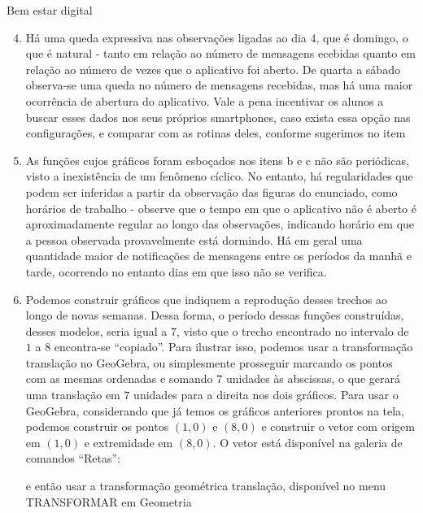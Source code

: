\clearmargin
\marginpar{\vspace{.5em}}
\begin{answer}{Bem estar digital}
{
	\begin{enumerate}[left=7.5pt, wide]\setcounter{enumi}{3}
	\item Há uma queda expressiva nas observações ligadas ao dia 4, que é domingo, o que é natural - tanto em relação ao número de mensagens  ecebidas quanto em relação ao número de vezes que o aplicativo foi aberto. De quarta a sábado observa-se uma queda no número de mensagens recebidas, mas há uma maior ocorrência de abertura do aplicativo. Vale a pena incentivar os alunos a buscar esses dados nos seus próprios smartphones, caso exista essa opção nas configurações, e comparar com as rotinas deles, conforme sugerimos no item 

	\item As funções cujos gráficos foram esboçados nos itens b e c não são periódicas, visto a inexistência de um fenômeno cíclico. No entanto, há regularidades que podem ser inferidas a partir da observação das figuras do enunciado, como horários de trabalho - observe que o tempo em que o aplicativo não é aberto é aproximadamente regular ao longo das observações, indicando horário em que a pessoa observada provavelmente está dormindo. Há em geral uma quantidade maior de notificações de mensagens entre os períodos da manhã e tarde, ocorrendo no entanto dias em que isso não se verifica.
	\item Podemos construir gráficos que indiquem a reprodução desses trechos ao longo de novas semanas. Dessa forma, o período dessas funções construídas, desses modelos, seria igual a $7$, visto que o trecho encontrado no intervalo de $1$ a $8$ encontra-se “copiado”. Para ilustrar isso,  podemos usar a transformação translação no GeoGebra, ou simplesmente prosseguir marcando os pontos com as mesmas ordenadas e somando $7$ unidades às abscissas, o que gerará uma translação em $7$ unidades para a direita nos dois gráficos. Para usar o GeoGebra, considerando que já temos os gráficos anteriores prontos na tela, podemos construir os pontos $(1,0)$ e $(8,0)$ e construir o vetor com origem em $(1,0)$ e extremidade em $(8,0)$. O vetor está disponível na galeria de comandos “Retas”:


	e então usar a transformação geométrica translação, disponível no menu TRANSFORMAR em Geometria


\end{enumerate}}
\end{answer}
